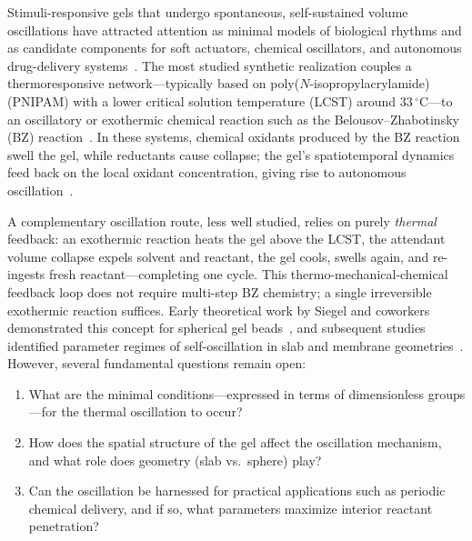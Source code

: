 \documentclass[aps,pre,reprint,superscriptaddress,longbibliography,floatfix]{revtex4-2}
\begin{document}
Stimuli-responsive gels that undergo spontaneous, self-sustained volume
oscillations have attracted attention as minimal models of biological
rhythms and as candidate components for soft actuators, chemical
oscillators, and autonomous drug-delivery
systems~\cite{Yoshida2010,Yashin2006}. The most studied synthetic
realization couples a thermoresponsive network---typically based on
poly($N$-isopropylacrylamide) (PNIPAM) with a lower critical solution
temperature (LCST) around $33\,^\circ\mathrm{C}$---to an oscillatory or
exothermic chemical reaction such as the Belousov--Zhabotinsky (BZ)
reaction~\cite{Yoshida2002,Yoshida2004}. In these systems, chemical
oxidants produced by the BZ reaction swell the gel, while reductants
cause collapse; the gel's spatiotemporal dynamics feed back on the local
oxidant concentration, giving rise to autonomous
oscillation~\cite{Yashin2006}.

A complementary oscillation route, less well studied, relies on purely
\emph{thermal} feedback: an exothermic reaction heats the gel above the
LCST, the attendant volume collapse expels solvent and reactant, the gel
cools, swells again, and re-ingests fresh reactant---completing one
cycle. This thermo-mechanical-chemical feedback loop does not require
multi-step BZ chemistry; a single irreversible exothermic reaction
suffices. Early theoretical work by Siegel and coworkers demonstrated
this concept for spherical gel beads~\cite{Siegel1988,Siegel1992}, and
subsequent studies identified parameter regimes of self-oscillation in
slab and membrane geometries~\cite{Zarzycki2020,Boissonade2003}.
However, several fundamental questions remain open:
\begin{enumerate}
  \item What are the minimal conditions---expressed in terms of
    dimensionless groups---for the thermal oscillation to occur?
  \item How does the spatial structure of the gel affect the oscillation
    mechanism, and what role does geometry (slab vs.\ sphere) play?
  \item Can the oscillation be harnessed for practical applications
    such as periodic chemical delivery, and if so, what parameters
    maximize interior reactant penetration?
\end{enumerate}
\end{document}
